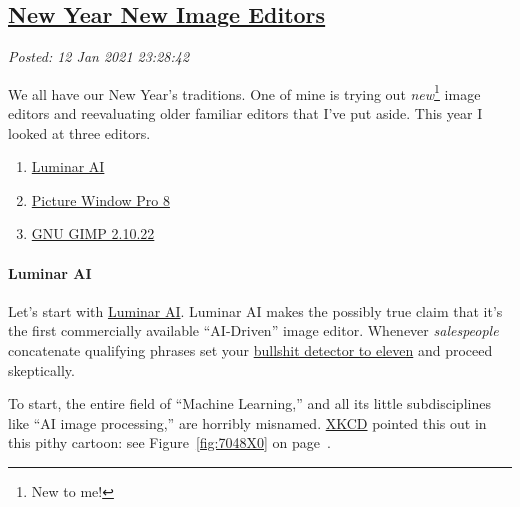 %

\subsection*{\href{http://analyzethedatanotthedrivel.org/2021/01/12/new-year-new-image-editors/}{New Year New Image Editors}}


\noindent\emph{Posted: 12 Jan 2021 23:28:42}
\vspace{6pt}

We all have our New Year's traditions. One of mine is trying out
\emph{new}\footnote{New to me!} image editors and
reevaluating older familiar editors that I've put aside. This year I
looked at three editors.

\begin{enumerate}
\def\labelenumi{\arabic{enumi}.}
\tightlist
\item
  \href{https://skylum.com/luminar/luminar-ai}{Luminar AI}
\item
  \href{https://www.dl-c.com/Downloads.html}{Picture Window Pro 8}
\item
  \href{https://www.gimp.org/}{GNU GIMP 2.10.22}
\end{enumerate}

\paragraph{Luminar AI}\label{luminar-ai}

Let's start with \href{https://skylum.com/luminar/luminar-ai}{Luminar AI}. 
Luminar AI makes the possibly true claim that it's the first
commercially available ``AI-Driven'' image editor. Whenever
\emph{salespeople} concatenate qualifying phrases set your
\href{https://duckduckgo.com/?q=spinal+tap+set+to+11\&t=brave\&iax=videos\&ia=videos\&iai=https\%3A\%2F\%2Fwww.youtube.com\%2Fwatch\%3Fv\%3DF7IZZXQ89Oc}{bullshit
detector to eleven} and proceed skeptically.

To start, the entire field of ``Machine Learning,'' and all its little
subdisciplines like ``AI image processing,'' are horribly misnamed.
\href{https://xkcd.com/}{XKCD} pointed this out in this pithy cartoon: see Figure~\ref{fig:7048X0} on page~\pageref{fig:7048X0}.



